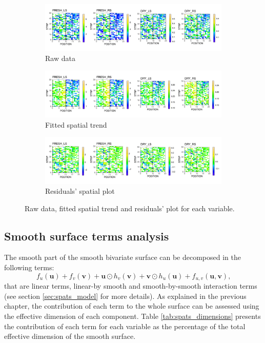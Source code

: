 \begin{figure}
	\begin{subfigure}[t]{\textwidth}
		\centering
		\includegraphics[width = \textwidth]{../../Figures/SPATS_rawData_plot.pdf}
		\caption{Raw data}
	\end{subfigure}
	
	\begin{subfigure}[t]{\textwidth}
		\centering
		\includegraphics[width = \textwidth]{../../Figures/SPATS_Fitted_plot.pdf}
		\caption{Fitted spatial trend}
	\end{subfigure}
	
	\begin{subfigure}[t]{\textwidth}
		\centering
		\includegraphics[width = \textwidth]{../../Figures/SPATS_residuals_plot.pdf}
		\caption{Residuals' spatial plot}
	\end{subfigure}
	\caption{Raw data, fitted spatial trend and residuals' plot for each variable.}
	\label{fig:spats_model_results}
\end{figure}

\subsection{Smooth surface terms analysis}
The smooth part of the smooth bivariate surface can be decomposed in the following terms:
\begin{equation}
	f_{u}(\boldsymbol{u})+f_{v}(\boldsymbol{v})+\boldsymbol{u} \odot h_{v}(\boldsymbol{v})+\boldsymbol{v} \odot h_{u}(\boldsymbol{u})+f_{u, v}(\boldsymbol{u}, \boldsymbol{v}) \text{,}
\end{equation}
that are linear terms, linear-by smooth and smooth-by-smooth interaction terms (see section \ref{sec:spats_model} for more details). As explained in the previous chapter, the contribution of each term to the whole surface can be assessed using the effective dimension of each component. Table \ref{tab:spats_dimensions} presents the contribution of each term for each variable as the percentage of the total effective dimension of the smooth surface.\\


